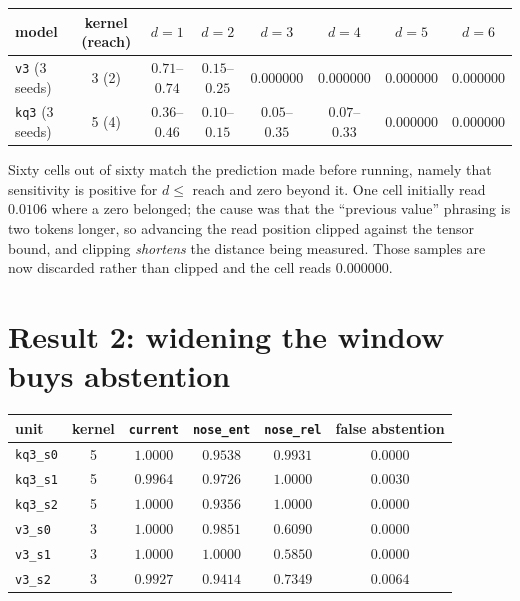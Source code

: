 \documentclass[11pt,a4paper]{article}
\begin{document}
\begin{center}
\begin{tabular}{lccccccc}
\toprule
model & kernel (reach) & $d{=}1$ & $d{=}2$ & $d{=}3$ & $d{=}4$ & $d{=}5$ & $d{=}6$ \\
\midrule
\texttt{v3} (3 seeds) & 3 (2) & $0.71$--$0.74$ & $0.15$--$0.25$ & $\mathbf{0.000000}$ & $\mathbf{0.000000}$ & $\mathbf{0.000000}$ & $\mathbf{0.000000}$ \\
\texttt{kq3} (3 seeds) & 5 (4) & $0.36$--$0.46$ & $0.10$--$0.15$ & $0.05$--$0.35$ & $0.07$--$0.33$ & $\mathbf{0.000000}$ & $\mathbf{0.000000}$ \\
\bottomrule
\end{tabular}
\end{center}

Sixty cells out of sixty match the prediction made before running, namely that sensitivity is positive
for $d \le$ reach and zero beyond it. One cell initially read $0.0106$ where a zero belonged; the cause
was that the ``previous value'' phrasing is two tokens longer, so advancing the read position clipped
against the tensor bound, and clipping \emph{shortens} the distance being measured. Those samples are
now discarded rather than clipped and the cell reads $0.000000$.

\section{Result 2: widening the window buys abstention}

\begin{center}
\begin{tabular}{lccccc}
\toprule
unit & kernel & \texttt{current} & \texttt{nose\_ent} & \textbf{\texttt{nose\_rel}} & false abstention \\
\midrule
\texttt{kq3\_s0} & 5 & $1.0000$ & $0.9538$ & $\mathbf{0.9931}$ & $0.0000$ \\
\texttt{kq3\_s1} & 5 & $0.9964$ & $0.9726$ & $\mathbf{1.0000}$ & $0.0030$ \\
\texttt{kq3\_s2} & 5 & $1.0000$ & $0.9356$ & $\mathbf{1.0000}$ & $0.0000$ \\
\midrule
\texttt{v3\_s0} & 3 & $1.0000$ & $0.9851$ & $0.6090$ & $0.0000$ \\
\texttt{v3\_s1} & 3 & $1.0000$ & $1.0000$ & $0.5850$ & $0.0000$ \\
\texttt{v3\_s2} & 3 & $0.9927$ & $0.9414$ & $0.7349$ & $0.0064$ \\
\bottomrule
\end{tabular}
\end{center}
\end{document}
